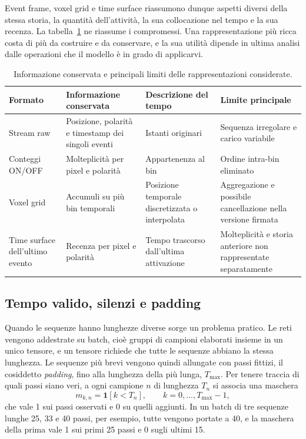 Event frame, voxel grid e time surface riassumono dunque aspetti diversi della stessa storia, la quantità dell'attività, la sua collocazione nel tempo e la sua recenza. La tabella~\ref{tab:confronto_rappresentazioni} ne riassume i compromessi. Una rappresentazione più ricca costa di più da costruire e da conservare, e la sua utilità dipende in ultima analisi dalle operazioni che il modello è in grado di applicarvi.

\begin{table}[tbp]
\centering
\small
\renewcommand{\arraystretch}{1.2}
\caption[Rappresentazioni degli eventi a confronto]{Informazione conservata e principali limiti delle rappresentazioni considerate.}
\label{tab:confronto_rappresentazioni}
\begin{tabularx}{\textwidth}{@{}>{\raggedright\arraybackslash}p{2.25cm} >{\raggedright\arraybackslash}X >{\raggedright\arraybackslash}X >{\raggedright\arraybackslash}X@{}}
\hline
\textbf{Formato} & \textbf{Informazione conservata} & \textbf{Descrizione del tempo} & \textbf{Limite principale} \\
\hline
Stream raw & Posizione, polarità e timestamp dei singoli eventi & Istanti originari & Sequenza irregolare e carico variabile \\
Conteggi ON/OFF & Molteplicità per pixel e polarità & Appartenenza al bin & Ordine intra-bin eliminato \\
Voxel grid & Accumuli su più bin temporali & Posizione temporale discretizzata o interpolata & Aggregazione e possibile cancellazione nella versione firmata \\
Time surface dell'ultimo evento & Recenza per pixel e polarità & Tempo trascorso dall'ultima attivazione & Molteplicità e storia anteriore non rappresentate separatamente \\
\hline
\end{tabularx}
\end{table}

\subsection{Tempo valido, silenzi e padding}
\label{subsec:tempo_valido_padding}

Quando le sequenze hanno lunghezze diverse sorge un problema pratico. Le reti vengono addestrate su batch, cioè gruppi di campioni elaborati insieme in un unico tensore, e un tensore richiede che tutte le sequenze abbiano la stessa lunghezza. Le sequenze più brevi vengono quindi allungate con passi fittizi, il cosiddetto \emph{padding}, fino alla lunghezza della più lunga, $T_{\max}$. Per tenere traccia di quali passi siano veri, a ogni campione $n$ di lunghezza $T_n$ si associa una maschera
\begin{equation}
\label{eq:maschera_passi_validi}
m_{k,n}=\mathbf 1[k<T_n],
\qquad k=0,\ldots,T_{\max}-1,
\end{equation}
che vale 1 sui passi osservati e 0 su quelli aggiunti. In un batch di tre sequenze lunghe 25, 33 e 40 passi, per esempio, tutte vengono portate a 40, e la maschera della prima vale 1 sui primi 25 passi e 0 sugli ultimi 15.

